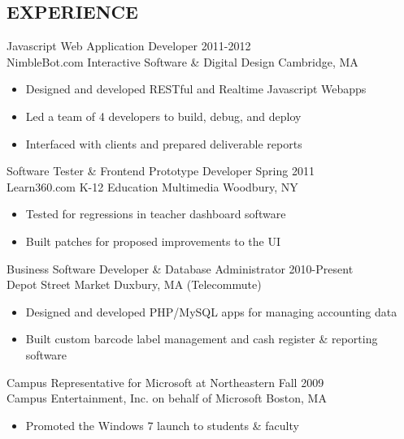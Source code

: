 \documentclass[line,margin]{res}
\begin{document}
\begin{resume}
\section{EXPERIENCE}
                {\large Javascript Web Application Developer} \hfill 2011-2012 \\
                NimbleBot.com Interactive Software \& Digital Design 
                \hfill Cambridge, MA
                 \begin{itemize}  \itemsep -2pt %
                 \item Designed and developed RESTful and Realtime Javascript Webapps
                 \item Led a team of 4 developers to build, debug, and deploy
                 \item Interfaced with clients and prepared deliverable reports
                \end{itemize}

                {\large Software Tester \& Frontend Prototype Developer}
                \hfill Spring 2011 \\
                Learn360.com K-12 Education Multimedia \hfill Woodbury, NY
                 \begin{itemize}  \itemsep -2pt %
                 \item Tested for regressions in teacher dashboard software
                 \item Built patches for proposed improvements to the UI
                \end{itemize}

                {\large Business Software Developer \& Database Administrator}
                \hfill 2010-Present \\
                Depot Street Market \hfill Duxbury, MA {\footnotesize (Telecommute)}
                 \begin{itemize}  \itemsep -2pt %
                 \item Designed and developed PHP/MySQL apps for managing accounting data
                 \item Built custom barcode label management and cash register \& reporting software
                \end{itemize}

                {\large Campus Representative for Microsoft at Northeastern}
                \hfill Fall 2009 \\
                Campus Entertainment, Inc. on behalf of Microsoft \hfill Boston, MA
                 \begin{itemize}  \itemsep -2pt %
                 \item Promoted the Windows 7 launch to students \& faculty
                \end{itemize}


\end{resume}
\end{document}
